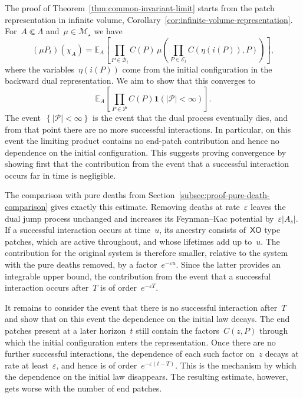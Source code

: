 \documentclass[EJP,preprint,NODS,nobera]{ejpecp}
\newcommand{\E}{\mathbb{E}}
\newcommand{\bb}[1]{\left(#1\right)}
\newcommand{\Cb}[1]{\left[#1\right]}
\newcommand{\cb}[1]{\left\{#1\right\}}
\newcommand{\abs}[1]{\left|#1\right|}
\newcommand{\ind}{\mathbf{1}}
\newcommand{\chg}[1]{{\color{changegreen}#1}}
\begin{document}
The proof of Theorem~\ref{thm:common-invariant-limit} starts from the patch
representation \chg{in infinite volume,
Corollary~\ref{cor:infinite-volume-representation}. For~$A\Subset\Lambda$
and~$\mu\in\mathcal M_\star$} we have
\begin{equation*}
(\mu P_t)(\chi_A)
=
\E_A\Cb{
\prod_{P\in\mathcal B_t}C(P)\,
\mu\bb{
\prod_{P\in\mathcal E_t}C\bb{\eta\bb{i(P)},P}
}
},
\end{equation*}
where the variables~$\eta(i(P))$ come from the initial configuration in the
backward dual representation. We aim to show that this converges to
\begin{equation*}
\E_A\Cb{
\prod_{P\in\mathcal P}C(P)
\ind\bb{\abs{\mathcal P}<\infty}
}.
\end{equation*}
The event~$\cb{\abs{\mathcal P}<\infty}$ is the event that the dual process
eventually dies, and from that point there are no more successful interactions.
In particular, on this event the limiting product contains no end-patch
contribution and hence no dependence on the initial configuration. This
suggests proving convergence by showing first that the contribution from the
event that a successful interaction occurs far in time is negligible.

The comparison with pure deaths from
Section~\ref{subsec:proof-pure-death-comparison} gives exactly this estimate.
Removing deaths at rate~$\varepsilon$ leaves the dual jump process unchanged
and increases its Feynman--Kac potential by~$\varepsilon\abs{A_s}$. If a successful interaction
occurs at time~$u$, its ancestry consists of~$\mathsf{XO}$ type patches, which are active throughout, and whose lifetimes add
up to~$u$. The contribution for the original system is therefore smaller,
relative to the system with the pure deaths removed, by a factor~$e^{-\varepsilon u}$. Since the latter provides an integrable upper bound,
the contribution from the event that a successful interaction occurs
after~$T$ is of order~$e^{-\varepsilon T}$.

It remains to consider the event that there is no successful interaction after~$T$ and show that on this event the dependence on the initial law decays. The
end patches present at a later horizon~$t$ still contain the factors~$C(z,P)$
through which the initial configuration enters the representation. Once there
are no further successful interactions, the dependence of each such factor
on~$z$ decays at rate at least~$\varepsilon$, and hence is of order~$e^{-\varepsilon(t-T)}$. This is the mechanism by which the dependence on the
initial law disappears. The resulting estimate, however, gets worse with the
number of end patches.
\end{document}
